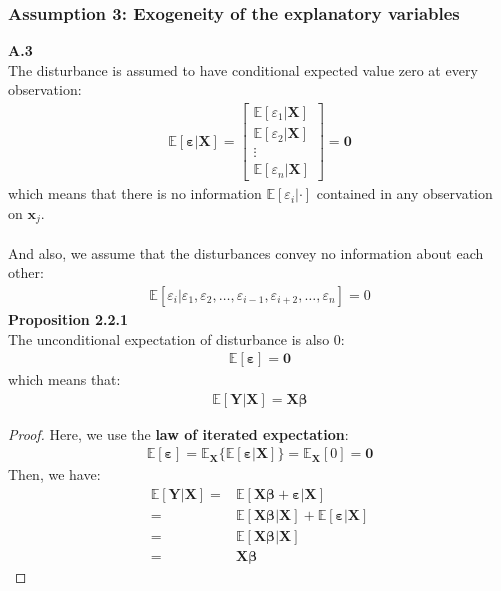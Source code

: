 \documentclass{article}
\begin{document}
\subsubsection{Assumption 3: Exogeneity of the explanatory variables}
\textbf{A.3}\\ 
The disturbance is assumed to have conditional expected value zero at every observation:
	\begin{align*}
		\mathbb{E}[\boldsymbol{\varepsilon} | \boldsymbol{X}] = \begin{bmatrix}
																	\mathbb{E}[\varepsilon_1|\boldsymbol{X}]\\
																	\mathbb{E}[\varepsilon_2|\boldsymbol{X}]\\
																	\vdots\\
																	\mathbb{E}[\varepsilon_n|\boldsymbol{X}]
																\end{bmatrix} = \boldsymbol{0}
	\end{align*}
which means that there is no information $\mathbb{E}[\varepsilon_i | \cdot]$ contained in any observation on $\boldsymbol{x}_j$.\\\\
And also, we assume that the disturbances convey no information about each other:
	\begin{align*}
		\mathbb{E}[\varepsilon_i | \varepsilon_1, \varepsilon_2, \ldots, \varepsilon_{i-1}, \varepsilon_{i+2}, \ldots, \varepsilon_n] = 0
	\end{align*}
\textbf{Proposition 2.2.1}\\
The unconditional expectation of disturbance is also 0:
	\begin{align*}
		\mathbb{E}[\boldsymbol{\varepsilon}] = \boldsymbol{0}
	\end{align*}
which means that:
	\begin{align*}
		\mathbb{E}[\boldsymbol{Y} | \boldsymbol{X}] = \boldsymbol{X}\boldsymbol{\beta}
	\end{align*}
	\begin{proof}
		Here, we use the \textbf{law of iterated expectation}:
			\begin{align*}
				\mathbb{E}[\boldsymbol{\varepsilon}] = \mathbb{E}_{\boldsymbol{X}}\{ \mathbb{E}[\boldsymbol{\varepsilon} | \boldsymbol{X}] \} = \mathbb{E}_{\boldsymbol{X}}[0] = \boldsymbol{0}
			\end{align*}
		Then, we have:
			\begin{align*}
				\mathbb{E}[\boldsymbol{Y} | \boldsymbol{X}] = &\mathbb{E}[\boldsymbol{X}\boldsymbol{\beta} + \boldsymbol{\varepsilon} | \boldsymbol{X}]\\
				= &\mathbb{E}[\boldsymbol{X}\boldsymbol{\beta} | \boldsymbol{X}] + \mathbb{E}[\boldsymbol{\varepsilon} | \boldsymbol{X}]\\
				= &\mathbb{E}[\boldsymbol{X}\boldsymbol{\beta} | \boldsymbol{X}]\\
				= &\boldsymbol{X}\boldsymbol{\beta}
			\end{align*}
	\end{proof}
\end{document}
